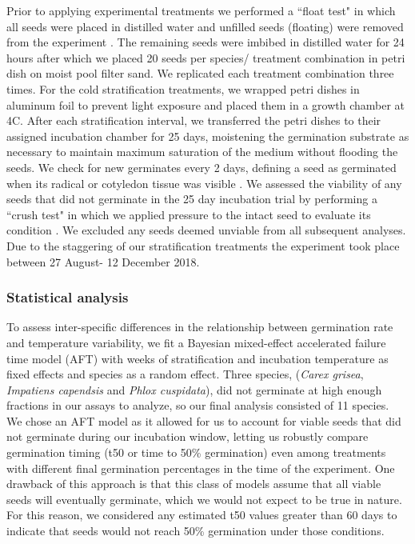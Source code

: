 \documentclass{article}\usepackage[]{graphicx}\usepackage[]{color}
\begin{document}
\noindent  Prior to applying experimental treatments we performed a ``float test" in which all seeds were placed in distilled water and unfilled seeds (floating) were removed from the experiment \citep{Baskin2014}. The remaining seeds were imbibed in distilled water for 24 hours after which we placed 20 seeds per species/ treatment combination in petri dish on moist pool filter sand. We replicated each treatment combination three times. For the cold stratification treatments, we wrapped petri dishes in aluminum foil to prevent light exposure and placed them in a growth chamber at 4\degree C. After each stratification interval, we transferred the petri dishes to their assigned incubation chamber for 25 days, moistening the germination substrate as necessary to maintain maximum saturation of the medium without flooding the seeds. We check for new germinates every 2 days, defining a seed as germinated when its radical or cotyledon tissue was visible \citep{Baskin2014}. We assessed the viability of any seeds that did not germinate in the 25 day incubation trial by performing a ``crush test" in which we applied pressure to the intact seed to evaluate its condition \citep{Baskin2014}. We excluded any seeds deemed unviable from all subsequent analyses. Due to the staggering of our stratification treatments the experiment took place between 27 August- 12 December 2018.\\

\subsubsection*{Statistical analysis}
To assess inter-specific differences in the relationship between germination rate and temperature variability, we fit a Bayesian mixed-effect accelerated failure time model (AFT) with weeks of stratification and incubation temperature as fixed effects and species as a random effect. Three species, (\textit{Carex grisea}, \textit{Impatiens capendsis} and \textit{Phlox cuspidata}), did not germinate at high enough fractions in our assays to analyze, so our final analysis consisted of 11 species.\\ 

We chose an AFT model as it allowed for us to account for viable seeds that did not germinate during our incubation window, letting us robustly compare germination timing (t50 or time to 50\% germination) even among treatments with different final germination percentages in the time of the experiment\citep{Soltani:2015aa}. One drawback of this approach is that this class of models assume that all viable seeds will eventually germinate, which we would not expect to be true in nature. For this reason, we considered any estimated t50 values greater than 60 days to indicate that seeds would not reach 50\% germination under those conditions. \\ 
\end{document}

